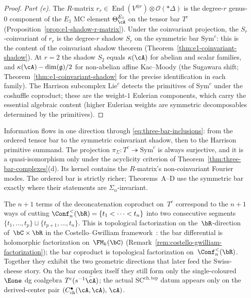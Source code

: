 \begin{proof}
\emph{Part\/ \textup{(e)}.}
The $R$-matrix $r_r \in \operatorname{End}(V^{\otimes r})
\otimes \mathcal{O}(*\Delta)$ is the degree-$r$
genus-$0$ component of the $E_1$ MC element
$\Theta_\cA^{E_1}$ on the tensor bar $T^c$
(Proposition~\ref{prop:e1-shadow-r-matrix}).
Under the coinvariant projection, the $S_r$-coinvariant of
$r_r$ is the degree-$r$ shadow $S_r$ on the
symmetric bar $\mathrm{Sym}^c$: this is the content
of the coinvariant shadow theorem
(Theorem~\ref{thm:e1-coinvariant-shadow}).
At $r = 2$ the shadow $S_2$ equals $\kappa(\cA)$ for
abelian and scalar families, and $\kappa(\cA) -
\dim(\mathfrak{g})/2$ for non-abelian affine
Kac--Moody (the Sugawara shift;
Theorem~\ref{thm:e1-coinvariant-shadow} for the
precise identification in each family).
The Harrison subcomplex $\mathrm{Lie}^c$ detects
the primitives of $\mathrm{Sym}^c$ under the
coshuffle coproduct; these are the weight-$1$
Eulerian components, which carry the essential
algebraic content (higher Eulerian weights are
symmetric decomposables determined by the primitives).
\end{proof}

\begin{remark}\label{rem:primacy-direction}
Information flows in one direction through
\eqref{eq:three-bar-inclusions}: from the ordered tensor bar to the
symmetric coinvariant shadow, then to the Harrison primitive summand.
The projection
$\pi_\Sigma\colon T^c \twoheadrightarrow \mathrm{Sym}^c$ is always
surjective, and it is a quasi-isomorphism only under the acyclicity
criterion of Theorem~\ref{thm:three-bar-complexes}(d). Its kernel
contains the $R$-matrix's non-coinvariant Fourier modes. The ordered
bar is strictly richer; Theorems~A--D use the symmetric bar exactly
where their statements are $\Sigma_n$-invariant.
\end{remark}

\begin{remark}
\label{rem:deconcatenation-topological}
%
%
The $n+1$ terms of the deconcatenation coproduct on~$T^c$
correspond to the $n+1$ ways of cutting
$\Conf_n^{<}(\bR) = \{t_1 < \cdots < t_n\}$ into two
consecutive segments $\{t_1,\ldots,t_p\} \sqcup
\{t_{p+1},\ldots,t_n\}$. This is topological factorization
on the~$\bR$-direction of~$\bC \times \bR$ in the
Costello--Gwilliam framework~\cite[\S5.4]{CG17}: the bar
differential is holomorphic factorization on~$\FM_k(\bC)$
(Remark~\ref{rem:costello-gwilliam-factorization}); the bar
coproduct is topological factorization on~$\Conf_n^{<}(\bR)$.
Together they exhibit the two geometric directions that later
feed the Swiss-cheese story. On the bar complex itself they still
form only the single-coloured $\Eone$ dg coalgebra
$T^c(s^{-1}\bar{\cA})$; the actual
$\mathrm{SC}^{\mathrm{ch,top}}$ datum appears only on the
derived-center pair
$(C^\bullet_{\mathrm{ch}}(\cA,\cA),\,\cA)$.
\end{remark}

